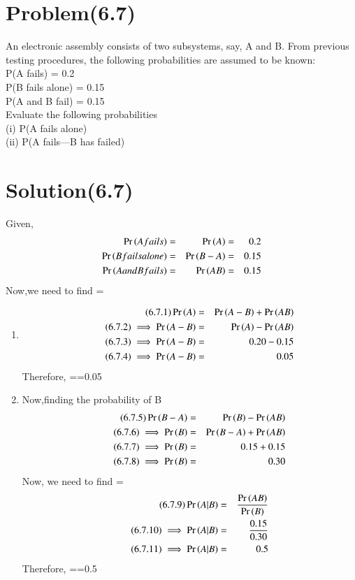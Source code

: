 \documentclass[journal,12pt,twocolumn]{IEEEtran}
\begin{document}
\section*{Problem(6.7)}
An electronic assembly consists of two
subsystems, say, A and B. From previous
testing procedures, the following probabilities are assumed to be known:\\
P(A fails) = 0.2\\
P(B fails alone) = 0.15\\
P(A and B fail) = 0.15\\
Evaluate the following probabilities\\
(i) P(A fails alone)\\
(ii) P(A fails—B has failed)\\
\section*{Solution(6.7)}
Given,\\
\begin{align*}
\Pr\left(A fails\right)&=&\Pr\left(A\right)&=&0.2\\
\Pr\left(B fails alone\right)&=&\Pr\left(B-A\right)&=&0.15\\
\Pr\left(A and B fails\right)&=&\Pr\left(AB\right)&=&0.15\\
\end{align*}
 Now,we need to find =
\begin{enumerate}
\item
\begin{align}
    \tag{6.7.1}
    \Pr\left(A\right)&=&\Pr\left(A-B\right)+\Pr\left(AB\right)\\
    \tag{6.7.2}
    \implies \Pr\left(A-B\right)&=&\Pr\left(A\right)-\Pr\left(AB\right)\\
    \tag{6.7.3}
    \implies \Pr\left(A-B\right)&=&0.20-0.15\\
    \tag{6.7.4}
    \implies \Pr\left(A-B\right)&=&0.05
\end{align}
Therefore, ==0.05\\
\item
Now,finding the probability of B
\begin{align}
    \tag{6.7.5}
    \Pr\left(B-A\right)&=&\Pr\left(B\right)-\Pr\left(AB\right)\\
    \tag{6.7.6}
    \implies \Pr\left(B\right)&=&\Pr\left(B-A\right)+\Pr\left(AB\right)\\
    \tag{6.7.7}
    \implies \Pr\left(B\right)&=&0.15+0.15\\
    \tag{6.7.8}
    \implies \Pr\left(B\right)&=&0.30
\end{align}
Now, we need to find =\\
\begin{align}
    \tag{6.7.9}
    \Pr\left(A|B\right)&=&\frac{\Pr\left(AB\right)}{\Pr\left(B\right)}\\
    \tag{6.7.10}
    \implies \Pr\left(A|B\right)&=&\frac{0.15}{0.30}\\
    \tag{6.7.11}
    \implies \Pr\left(A|B\right)&=&0.5
\end{align}
Therefore, ==0.5\\
\end{enumerate}
\end{document}
